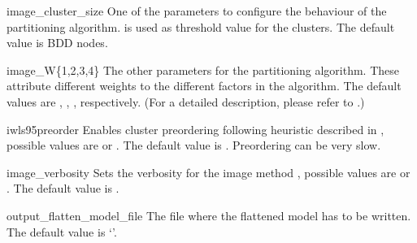 
\begin{nusmvVar}{image\_cluster\_size}{}{}
One of the parameters to configure the behaviour of the \Iwls
partitioning algorithm.  is used as
threshold value for the clusters. The default value is 
BDD nodes.
\end{nusmvVar}

\begin{nusmvVar}{image\_W\{1,2,3,4\}}{}{}
The other parameters for the \Iwls partitioning algorithm. These
attribute different weights to the different factors in the
algorithm. The default values are , ,
,  respectively. (For a detailed description,
please refer to \cite{RAP+95}.)
\end{nusmvVar}

\begin{nusmvVar} {iwls95preorder}{}{}
Enables cluster preordering following heuristic described in
\cite{RAP+95}, possible values are  or . The
default value is . Preordering can be very slow.
\end{nusmvVar}

\begin{nusmvVar} {image\_verbosity}{}{}
Sets the verbosity for the image method \Iwls, possible values
are  or . The default value is .
\end{nusmvVar}









\begin{nusmvVar} {output\_flatten\_model\_file}{}{}
The file where the flattened model has to be written. The default value is
`'.
\end{nusmvVar}

